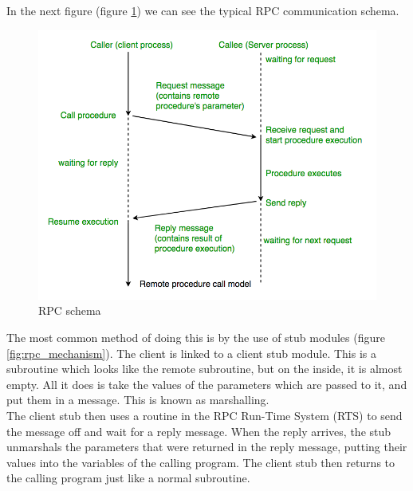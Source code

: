 \documentclass[a4paper, 12pt]{article} %
\begin{document}
                In the next figure (figure \ref{fig:rpc_schema}) we can see the typical RPC communication schema.
                \begin{figure}[h]
                    \centering
                    \includegraphics[width=1.0\textwidth]{rpc.png}
                    \caption{RPC schema}
                    \label{fig:rpc_schema}
                \end{figure}
                The most common method of doing this is by the use of stub modules (figure \ref{fig:rpc_mechanism}). The client is linked to a client stub module. This is a subroutine which looks like the remote subroutine, but on the inside, it is almost empty. All it does is take the values of the parameters which are passed to it, and put them in a message. This is known as marshalling.\\

                The client stub then uses a routine in the RPC Run-Time System (RTS) to send the message off and wait for a reply message. When the reply arrives, the stub unmarshals the parameters that were returned in the reply message, putting their values into the variables of the calling program. The client stub then returns to the calling program just like a normal subroutine.\\
\end{document}

